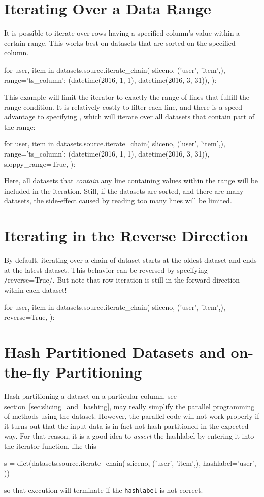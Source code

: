 \section{Iterating Over a Data Range}
\label{sec:iterate_sloppy_range}
It is possible to iterate over rows having a specified column's value
within a certain range.  This works best on datasets that are sorted
on the specified column.
\begin{python}
for user, item in datasets.source.iterate_chain(
    sliceno,
    ('user', 'item',),
    range={'ts_column': (datetime(2016, 1, 1), datetime(2016, 3, 31))},
):
\end{python}
This example will limit the iterator to exactly the range of lines
that fulfill the range condition.  It is relatively costly to filter
each line, and there is a speed advantage to specifying
, which will iterate over all datasets that
contain part of the range:
\begin{python}
for user, item in datasets.source.iterate_chain(
    sliceno,
    ('user', 'item',),
    range={'ts_column': (datetime(2016, 1, 1), datetime(2016, 3, 31))},
    sloppy_range=True,
):
\end{python}
Here, all datasets that \textsl{contain} any line containing values
within the range will be included in the iteration.  Still, if the
datasets are sorted, and there are many datasets, the side-effect
caused by reading too many lines will be limited.



\section{Iterating in the Reverse Direction}
By default, iterating over a chain of dataset starts at the oldest
dataset and ends at the latest dataset.  This behavior can be
reversed by specifying \texttt/reverse=True/.  But note
that row iteration is still in the forward direction within each
dataset!
\begin{python}
for user, item in datasets.source.iterate_chain(
    sliceno,
    ('user', 'item',),
    reverse=True,
):
\end{python}



\section{Hash Partitioned Datasets and on-the-fly Partitioning}
Hash partitioning a dataset on a particular column, see
section~\ref{sec:slicing_and_hashing}, may really simplify the
parallel programming of methods using the dataset.  However, the
parallel code will not work properly if it turns out that the input
data is in fact not hash partitioned in the expected way.  For that
reason, it is a good idea to \emph{assert} the hashlabel by entering
it into the iterator function, like this
\begin{python}
s = dict(datasets.source.iterate_chain(
    sliceno, ('user', 'item',), hashlabel='user',
))
\end{python}
so that execution will terminate if the \texttt{hashlabel} is not correct.

